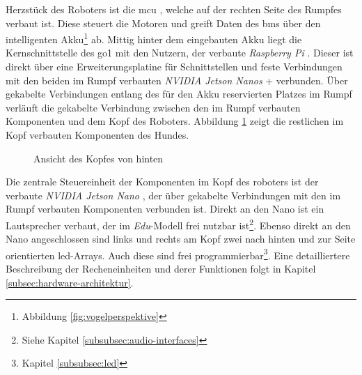 Herzstück des Roboters ist die \gls{mcu} , welche auf der rechten Seite des Rumpfes verbaut ist.
Diese steuert die Motoren und greift Daten des \gls{bms}  über den intelligenten Akku\footnote{Abbildung \ref{fig:vogelperspektive} }
ab.
Mittig hinter dem eingebauten Akku liegt die Kernschnittstelle des \gls{go1} mit den Nutzern, der verbaute \emph{Raspberry Pi}
.
Dieser ist direkt über eine Erweiterungsplatine  für Schnittstellen und feste Verbindungen mit den beiden im Rumpf
verbauten \emph{NVIDIA Jetson Nanos} + verbunden.
Über gekabelte Verbindungen entlang des für den Akku reservierten Platzes im Rumpf verläuft die gekabelte Verbindung 
zwischen den im Rumpf verbauten Komponenten und dem Kopf des Roboters.
Abbildung \ref{fig:kopf} zeigt die restlichen im Kopf verbauten Komponenten des Hundes.

\begin{figure}[h]
    \caption{Ansicht des Kopfes von hinten}\label{fig:kopf}
\end{figure}

Die zentrale Steuereinheit der Komponenten im Kopf des roboters ist der verbaute \emph{NVIDIA Jetson Nano} , der
über gekabelte Verbindungen  mit den im Rumpf verbauten Komponenten verbunden ist.
Direkt an den Nano ist ein Lautsprecher  verbaut, der im \emph{Edu}-Modell frei nutzbar ist\footnote{Siehe Kapitel \ref{subsubsec:audio-interfaces}}.
Ebenso direkt an den Nano angeschlossen sind links und rechts am Kopf zwei nach hinten und zur Seite orientierten
\gls{led}-Arrays.
Auch diese sind frei programmierbar\footnote{Kapitel \ref{subsubsec:led}}.
Eine detailliertere Beschreibung der Recheneinheiten und derer Funktionen folgt in Kapitel \ref{subsec:hardware-architektur}.

